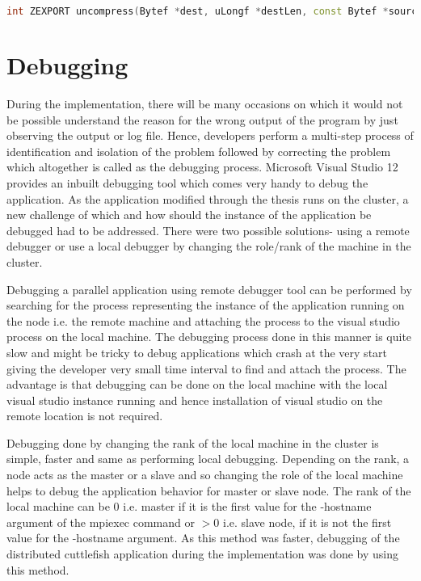 \begin{lstlisting}[language=C++,label={lst:uncompress},caption={API to uncompress the data}]																	
int ZEXPORT uncompress(Bytef *dest, uLongf *destLen, const Bytef *source, uLong sourceLen);															
\end{lstlisting} 																	

\section{Debugging}

During the implementation, there will be many occasions on which it would not be possible understand the reason for the wrong output of the program by just observing the output or log file. Hence, developers perform a multi-step process of identification and isolation of the problem followed by correcting the problem which altogether is called as the debugging process. Microsoft Visual Studio 12 provides an inbuilt debugging tool which comes very handy to debug the application. 
As the application modified through the thesis runs on the cluster, a new challenge of which and how should the instance of the application be debugged had to be addressed. There were two possible solutions- using a remote debugger or use a local debugger by changing the role/rank of the machine in the cluster. \newline

Debugging a parallel application using remote debugger tool can be performed by searching for the process representing the instance of the application running on the node i.e. the remote machine and attaching the process to the visual studio process on the local machine. The debugging process done in this manner is quite slow and might be tricky to debug applications which crash at the very start giving the developer very small time interval to find and attach the process. The advantage is that debugging can be done on the local machine with the local visual studio instance running and hence installation of visual studio on the remote location is not required. \newline

Debugging done by changing the rank of the local machine in the cluster is simple, faster and same as performing local debugging. Depending on the rank, a node acts as the master or a slave and so changing the role of the local machine helps to debug the application behavior for master or slave node. The rank of the local machine can be 0 i.e. master if it is the first value for the -hostname argument of the mpiexec command or \begin{math}>0 \end{math} i.e. slave node, if it is not the first value for the -hostname argument. As this method was faster, debugging of the distributed cuttlefish application during the implementation was done by using this method. 


